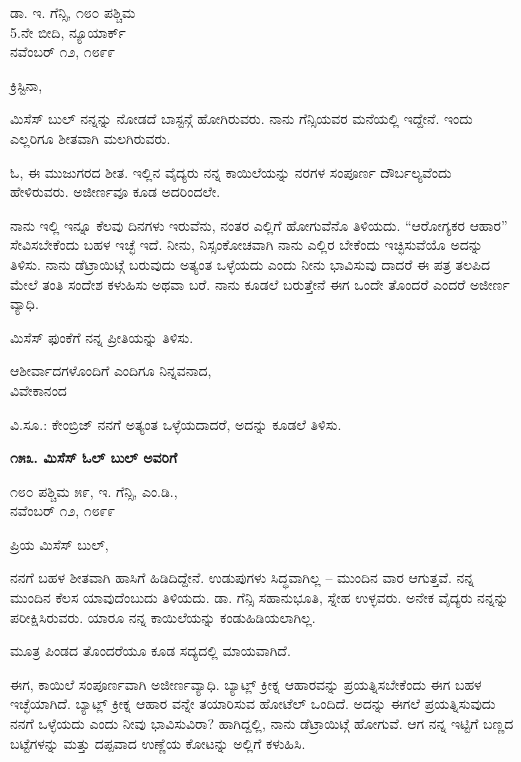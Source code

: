 \begin{flushright}
 ಡಾ. ಇ. ಗೆನ್ಸಿ, ೧೮೦ ಪಶ್ಚಿಮ\\5.ನೇ ಬೀದಿ, ನ್ಯೂಯಾರ್ಕ್\\ನವೆಂಬರ್ ೧೨, ೧೮೯೯
\end{flushright}

ಕ್ರಿಸ್ಟಿನಾ,

ಮಿಸೆಸ್ ಬುಲ್ ನನ್ನನ್ನು ನೋಡದೆ ಬಾಸ್ಟನ್ಗೆ ಹೋಗಿರುವರು. ನಾನು ಗೆನ್ಸಿಯವರ ಮನೆಯಲ್ಲಿ ಇದ್ದೇನೆ. ಇಂದು ಎಲ್ಲರಿಗೂ ಶೀತವಾಗಿ ಮಲಗಿರುವರು.

ಓ, ಈ ಮುಜುಗರದ ಶೀತ. ಇಲ್ಲಿನ ವೈದ್ಯರು ನನ್ನ ಕಾಯಿಲೆಯನ್ನು ನರಗಳ ಸಂಪೂರ್ಣ ದೌರ್ಬಲ್ಯವೆಂದು ಹೇಳಿರುವರು. ಅಜೀರ್ಣವೂ ಕೂಡ ಅದರಿಂದಲೇ.

ನಾನು ಇಲ್ಲಿ ಇನ್ನೂ ಕೆಲವು ದಿನಗಳು ಇರುವೆನು, ನಂತರ ಎಲ್ಲಿಗೆ ಹೋಗುವೆನೊ ತಿಳಿಯದು. “ಆರೋಗ್ಯಕರ ಆಹಾರ” ಸೇವಿಸಬೇಕೆಂದು ಬಹಳ ಇಚ್ಛೆ ಇದೆ. ನೀನು, ನಿಸ್ಸಂಕೋಚವಾಗಿ ನಾನು ಎಲ್ಲಿರ ಬೇಕೆಂದು ಇಚ್ಛಿಸುವೆಯೊ ಅದನ್ನು ತಿಳಿಸು. ನಾನು ಡೆಟ್ರಾಯಿಟ್ಗೆ ಬರುವುದು ಅತ್ಯಂತ ಒಳ್ಳೆಯದು ಎಂದು ನೀನು ಭಾವಿಸುವು ದಾದರೆ ಈ ಪತ್ರ ತಲಪಿದ ಮೇಲೆ ತಂತಿ ಸಂದೇಶ ಕಳುಹಿಸು ಅಥವಾ ಬರೆ. ನಾನು ಕೂಡಲೆ ಬರುತ್ತೇನೆ ಈಗ ಒಂದೇ ತೊಂದರೆ ಎಂದರೆ ಅಜೀರ್ಣ ವ್ಯಾಧಿ.

ಮಿಸೆಸ್ ಫುಂಕೆಗೆ ನನ್ನ ಪ್ರೀತಿಯನ್ನು ತಿಳಿಸು.

\begin{flushright}
ಆಶೀರ್ವಾದಗಳೊಂದಿಗೆ ಎಂದಿಗೂ ನಿನ್ನವನಾದ,\\ವಿವೇಕಾನಂದ
\end{flushright}

ವಿ.ಸೂ.: ಕೇಂಬ್ರಿಜ್ ನನಗೆ ಅತ್ಯಂತ ಒಳ್ಳೆಯದಾದರೆ, ಅದನ್ನು ಕೂಡಲೆ ತಿಳಿಸು.

\begin{center}
\textbf{೧೫೩. ಮಿಸೆಸ್ ಓಲ್ ಬುಲ್ ಅವರಿಗೆ}
\end{center}

\begin{flushright}
೧೮೦ ಪಶ್ಚಿಮ ೫೯,  ಇ. ಗೆನ್ಸಿ, ಎಂ.ಡಿ.,\\ನವೆಂಬರ್ ೧೨, ೧೮೯೯
\end{flushright}

ಪ್ರಿಯ ಮಿಸೆಸ್ ಬುಲ್,

ನನಗೆ ಬಹಳ ಶೀತವಾಗಿ ಹಾಸಿಗೆ ಹಿಡಿದಿದ್ದೇನೆ. ಉಡುಪುಗಳು ಸಿದ್ಧವಾಗಿಲ್ಲ – ಮುಂದಿನ ವಾರ ಆಗುತ್ತವೆ. ನನ್ನ ಮುಂದಿನ ಕೆಲಸ ಯಾವುದೆಂಬುದು ತಿಳಿಯದು. ಡಾ. ಗೆನ್ಸಿ ಸಹಾನುಭೂತಿ, ಸ್ನೇಹ ಉಳ್ಳವರು. ಅನೇಕ ವೈದ್ಯರು ನನ್ನನ್ನು ಪರೀಕ್ಷಿಸಿರುವರು. ಯಾರೂ ನನ್ನ ಕಾಯಿಲೆಯನ್ನು ಕಂಡುಹಿಡಿಯಲಾಗಿಲ್ಲ.

ಮೂತ್ರ ಪಿಂಡದ ತೊಂದರೆಯೂ ಕೂಡ ಸದ್ಯದಲ್ಲಿ ಮಾಯವಾಗಿದೆ.

ಈಗ, ಕಾಯಿಲೆ ಸಂಪೂರ್ಣವಾಗಿ ಅಜೀರ್ಣವ್ಯಾಧಿ. ಬ್ಯಾಟ್ಲ್ ಕ್ರೀಕ್ನ ಆಹಾರವನ್ನು ಪ್ರಯತ್ನಿಸಬೇಕೆಂದು ಈಗ ಬಹಳ ಇಚ್ಛೆಯಾಗಿದೆ. ಬ್ಯಾಟ್ಲ್ ಕ್ರೀಕ್ನ ಆಹಾರ ವನ್ನೇ ತಯಾರಿಸುವ ಹೋಟೆಲ್ ಒಂದಿದೆ. ಅದನ್ನು ಈಗಲೆ ಪ್ರಯತ್ನಿಸುವುದು ನನಗೆ ಒಳ್ಳೆಯದು ಎಂದು ನೀವು ಭಾವಿಸುವಿರಾ? ಹಾಗಿದ್ದಲ್ಲಿ, ನಾನು ಡೆಟ್ರಾಯಿಟ್ಗೆ ಹೋಗುವೆ. ಆಗ ನನ್ನ ಇಟ್ಟಿಗೆ ಬಣ್ಣದ ಬಟ್ಟೆಗಳನ್ನು ಮತ್ತು ದಪ್ಪವಾದ ಉಣ್ಣೆಯ ಕೋಟನ್ನು ಅಲ್ಲಿಗೆ ಕಳುಹಿಸಿ.


